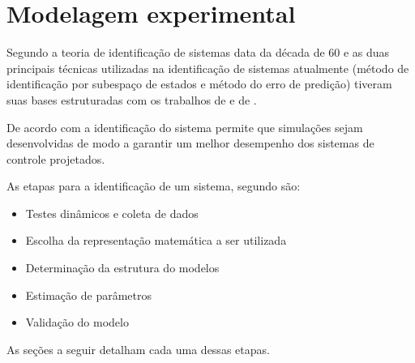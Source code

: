 
\chapter{Modelagem experimental}
\label{ch:modelagem_experimental}

Segundo  a teoria de identificação de sistemas data da década de 60 e as duas
principais técnicas utilizadas na identificação de sistemas atualmente (método de identificação por
subespaço de estados e método do erro de predição) tiveram suas bases estruturadas com os trabalhos
de  e de .

De acordo com  a identificação do sistema permite que simulações
sejam desenvolvidas de modo a garantir um melhor desempenho dos sistemas de controle projetados.

As etapas para a identificação de um sistema, segundo  são:
\begin{itemize}
    \item Testes dinâmicos e coleta de dados
    \item Escolha da representação matemática a ser utilizada
    \item Determinação da estrutura do modelos
    \item Estimação de parâmetros
    \item Validação do modelo
\end{itemize}

As seções a seguir detalham cada uma dessas etapas.


